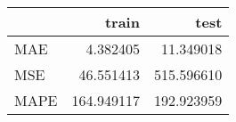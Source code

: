 \begin{tabular}{lrr}
\toprule
{} &       train &        test \\
\midrule
MAE  &    4.382405 &   11.349018 \\
MSE  &   46.551413 &  515.596610 \\
MAPE &  164.949117 &  192.923959 \\
\bottomrule
\end{tabular}
